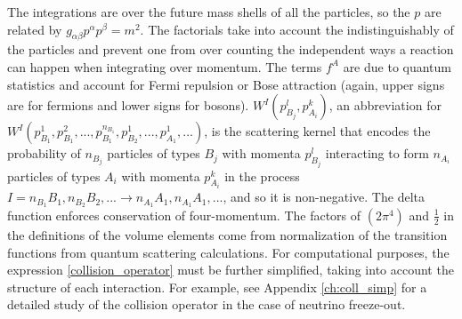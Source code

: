   The integrations are over the future mass shells of all the particles, so the $p$ are related by $g_{\alpha \beta}p^\alpha p^\beta=m^2$. The factorials take into account the indistinguishably of the particles and prevent one from over counting the independent ways a reaction can happen when integrating over momentum.  The terms $f^A$ are due to quantum statistics and account for Fermi repulsion or Bose attraction (again, upper signs are for fermions and lower signs for bosons).  $W^I(p_{B_j}^l,p_{A_i}^k)$, an abbreviation for  $W^I(p_{B_1}^1,p_{B_1}^2,...,p_{B_1}^{n_{B_1}},p_{B_2}^1,...,p_{A_1}^1,...)$, is the scattering kernel that encodes the probability of $n_{B_j}$ particles of types $B_j$ with momenta $p_{B_j}^l$ interacting to form $n_{A_i}$ particles of types $A_i$ with momenta $p_{A_i}^k$ in the process $I=n_{B_1}B_1,n_{B_2}B_2,...\longrightarrow n_{A_1}A_1,n_{A_1}A_1,...$, and so it is non-negative.  The delta function enforces conservation of four-momentum. The factors of $(2\pi^4)$ and $\frac{1}{2}$ in the definitions of the volume elements come from normalization of the transition functions from quantum scattering calculations.  For computational purposes, the expression \eqref{collision_operator} must be further simplified, taking into account the structure of each interaction.  For example, see Appendix \ref{ch:coll_simp} for a detailed study of the collision operator in the case of neutrino freeze-out.

